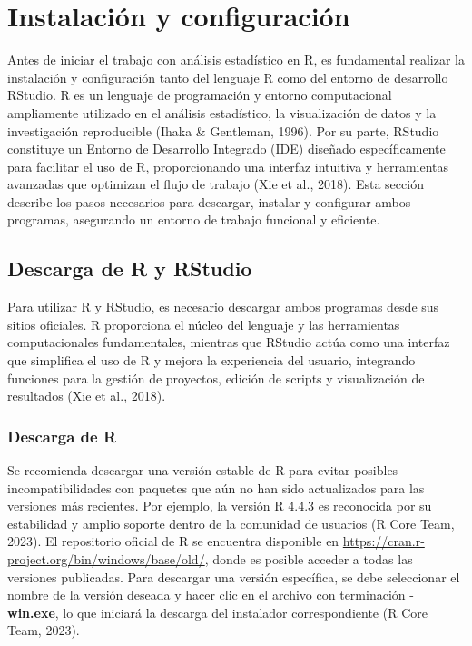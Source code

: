 \documentclass[
  spanish,
  letterpaper,
]{book}
\begin{document}

\chapter{Instalación y
configuración}\label{instalaciuxf3n-y-configuraciuxf3n}

Antes de iniciar el trabajo con análisis estadístico en R, es
fundamental realizar la instalación y configuración tanto del lenguaje R
como del entorno de desarrollo RStudio. R es un lenguaje de programación
y entorno computacional ampliamente utilizado en el análisis
estadístico, la visualización de datos y la investigación reproducible
(Ihaka \& Gentleman, 1996). Por su parte, RStudio constituye un Entorno
de Desarrollo Integrado (IDE) diseñado específicamente para facilitar el
uso de R, proporcionando una interfaz intuitiva y herramientas avanzadas
que optimizan el flujo de trabajo (Xie et al., 2018). Esta sección
describe los pasos necesarios para descargar, instalar y configurar
ambos programas, asegurando un entorno de trabajo funcional y eficiente.

\section{Descarga de R y RStudio}\label{descarga-de-r-y-rstudio}

Para utilizar R y RStudio, es necesario descargar ambos programas desde
sus sitios oficiales. R proporciona el núcleo del lenguaje y las
herramientas computacionales fundamentales, mientras que RStudio actúa
como una interfaz que simplifica el uso de R y mejora la experiencia del
usuario, integrando funciones para la gestión de proyectos, edición de
scripts y visualización de resultados (Xie et al., 2018).

\subsection{Descarga de R}\label{descarga-de-r}

Se recomienda descargar una versión estable de R para evitar posibles
incompatibilidades con paquetes que aún no han sido actualizados para
las versiones más recientes. Por ejemplo, la versión
\href{https://cran.r-project.org/bin/windows/base/old/4.4.3/R-4.4.3-win.exe}{R
4.4.3} es reconocida por su estabilidad y amplio soporte dentro de la
comunidad de usuarios (R Core Team, 2023). El repositorio oficial de R
se encuentra disponible en
\url{https://cran.r-project.org/bin/windows/base/old/}, donde es posible
acceder a todas las versiones publicadas. Para descargar una versión
específica, se debe seleccionar el nombre de la versión deseada y hacer
clic en el archivo con terminación -\textbf{win.exe}, lo que iniciará la
descarga del instalador correspondiente (R Core Team, 2023).
\end{document}
